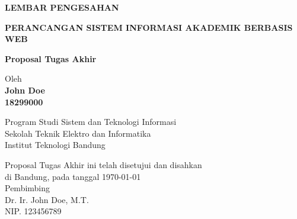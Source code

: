 \documentclass[12pt,a4paper,oneside]{book}
\begin{document}
\newpage
\thispagestyle{empty}
\begin{center}
  \textbf{\large LEMBAR PENGESAHAN}\\[1cm]
  \vspace*{1.5cm}
    
  {\large\bfseries PERANCANGAN SISTEM INFORMASI AKADEMIK BERBASIS WEB}\\
     \vspace{2cm}

  {\Large \textbf{Proposal Tugas Akhir}}\\


  \vspace{1.5cm}
    
    
  {\large Oleh}\\[0.3cm]
    \textbf{
    {\large John Doe}\\
    {\large 18299000}
  }\\
    
  \vspace{0.5cm}
 
  {\large Program Studi Sistem dan Teknologi Informasi}\\
  {\large Sekolah Teknik Elektro dan Informatika}\\
  {\large Institut Teknologi Bandung}\\

  \vspace{1.5cm}

  Proposal Tugas Akhir ini telah disetujui dan disahkan\\ 
  di Bandung, pada tanggal \today\\[1cm]

	Pembimbing  \\[3cm]
	Dr. Ir. John Doe, M.T.   \\[0.2cm]
	NIP. 123456789 

\end{center}

\vspace{1cm}
\noindent

\end{document}
